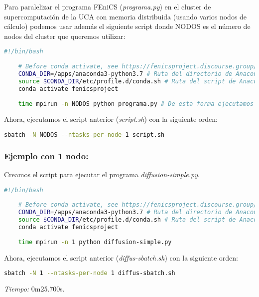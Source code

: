 Para paralelizar el programa FEniCS (\textit{programa.py}) en el cluster de supercomputación de la UCA con memoria distribuida (usando varios nodos de cálculo) podemos usar además el siguiente script donde NODOS es el número de nodos del cluster que queremos utilizar:
\begin{lstlisting}[language=sh]
	#!/bin/bash
	
	# Before conda activate, see https://fenicsproject.discourse.group/t/fenics-from-conda-doesnt-import/3502/6
	CONDA_DIR=/apps/anaconda3-python3.7 # Ruta del directorio de Anaconda
	source $CONDA_DIR/etc/profile.d/conda.sh # Ruta del script de Anaconda
	conda activate fenicsproject
	
	time mpirun -n NODOS python programa.py # De esta forma ejecutamos tantos procesos como indiquemos con NODOS, hay que cambiar el numero de procesos y ajustarlo al numero de nodos del cluster que queramos usar
\end{lstlisting}

Ahora, ejecutamos el script anterior (\textit{script.sh}) con la siguiente orden:
\begin{lstlisting}[language=sh]
sbatch -N NODOS --ntasks-per-node 1 script.sh
\end{lstlisting}

\subsubsection*{Ejemplo con 1 nodo:}

Creamos el script para ejecutar el programa \textit{diffusion-simple.py}.
\begin{lstlisting}[language=sh]
	#!/bin/bash
	
	# Before conda activate, see https://fenicsproject.discourse.group/t/fenics-from-conda-doesnt-import/3502/6
	CONDA_DIR=/apps/anaconda3-python3.7 # Ruta del directorio de Anaconda
	source $CONDA_DIR/etc/profile.d/conda.sh # Ruta del script de Anaconda
	conda activate fenicsproject
	
	time mpirun -n 1 python diffusion-simple.py
\end{lstlisting}

Ahora, ejecutamos el script anterior (\textit{diffus-sbatch.sh}) con la siguiente orden:
\begin{lstlisting}[language=sh]
	sbatch -N 1 --ntasks-per-node 1 diffus-sbatch.sh
\end{lstlisting}

\textit{Tiempo:} 0m25.700s.

